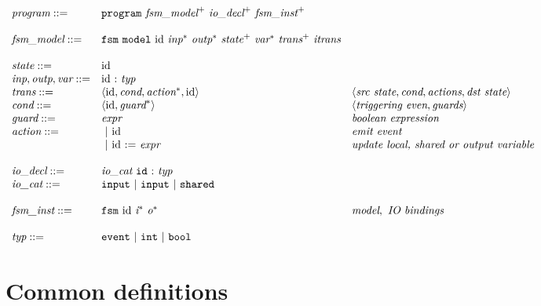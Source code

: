\newcommand{\tm}[1]{\mathtt{#1}}
\newcommand{\ut}[1]{\emph{#1}}
\newcommand{\cat}[1]{\text{#1}}

\bigskip
$  \begin{array}{lll}
    \ut{program} ::= & \tm{program}~\ut{fsm\_model}^+~\ut{io\_decl}^+~\ut{fsm\_inst}^+ & \\
    \\
    \ut{fsm\_model}  ::= & \tm{fsm\ model}~\cat{id}~\ut{inp}^*~\ut{outp}^*~\ut{state}^+~\ut{var}^*~\ut{trans}^+~\ut{itrans} &\\
    \\
    \ut{state}  ::= &  \cat{id} \\
    \ut{inp},\ut{outp},\ut{var}  ::= &  \cat{id}~\tm{:}~\ut{typ} & \\
    \ut{trans} ::= & \ttttuple{\cat{id}}{\ut{cond}}{\ut{action}^*}{\cat{id}} & \ttttuple{\emtxt{src
                                                                               state}}{\ut{cond}}{\ut{actions}}{\emtxt{dst
                                                                               state}} \\
    \ut{cond} ::= & \ttuple{\cat{id}}{\ut{guard}^*} & \ttuple{\emtxt{triggering even}}{\ut{guards}} \\
    \ut{guard} ::= & \ut{expr} & \emtxt{boolean expression} \\
    \ut{action} ::= & ~|\ \cat{id} & \emtxt{emit event} \\
                    & ~|\ \cat{id}~\tm{:=}~\ut{expr} & \emtxt{update local, shared or output
                                                       variable}\\
    \\
    \ut{io\_decl}  ::= & \ut{io\_cat}~\tm{id}~\tm{:}~\ut{typ} &\\
    \ut{io\_cat} ::= & \tm{input} ~|~ \tm{input} ~|~ \tm{shared} & \\
    \\
    \ut{fsm\_inst} ::= & \tm{fsm}~\cat{id}~\ut{i}^*~\ut{o}^* & \emtxt{model},\ \emtxt{IO bindings}\\
    \\
    \ut{typ} ::= & \tm{event}~|~\tm{int}~|~\tm{bool} \\
  \end{array} $

\section{Common definitions}
\label{sec:general-definitions}

